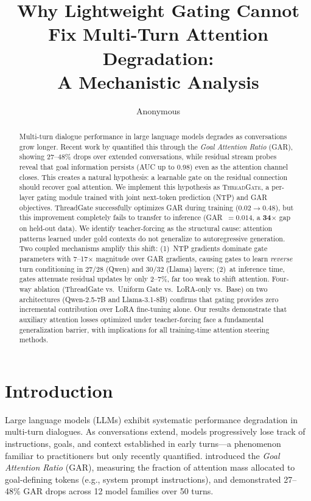 \documentclass[11pt,a4paper]{article}
\title{Why Lightweight Gating Cannot Fix Multi-Turn Attention Degradation:\\A Mechanistic Analysis}
\author{Anonymous}
\date{}
\begin{document}
\maketitle

\begin{abstract}
Multi-turn dialogue performance in large language models degrades as conversations grow longer.
Recent work by \citet{dongre2026} quantified this through the \emph{Goal Attention Ratio} (GAR), showing 27--48\% drops over extended conversations, while residual stream probes reveal that goal information persists (AUC up to 0.98) even as the attention channel closes.
This creates a natural hypothesis: a learnable gate on the residual connection should recover goal attention.
We implement this hypothesis as \textsc{ThreadGate}, a per-layer gating module trained with joint next-token prediction (NTP) and GAR objectives.
ThreadGate successfully optimizes GAR during training ($0.02 \to 0.48$), but this improvement completely fails to transfer to inference (GAR~$= 0.014$, a \textbf{34$\times$} gap on held-out data).
We identify teacher-forcing as the structural cause: attention patterns learned under gold contexts do not generalize to autoregressive generation.
Two coupled mechanisms amplify this shift: (1)~NTP gradients dominate gate parameters with 7--17$\times$ magnitude over GAR gradients, causing gates to learn \emph{reverse} turn conditioning in 27/28 (Qwen) and 30/32 (Llama) layers; (2)~at inference time, gates attenuate residual updates by only 2--7\%, far too weak to shift attention.
Four-way ablation (ThreadGate vs.\ Uniform Gate vs.\ LoRA-only vs.\ Base) on two architectures (Qwen-2.5-7B and Llama-3.1-8B) confirms that gating provides zero incremental contribution over LoRA fine-tuning alone.
Our results demonstrate that auxiliary attention losses optimized under teacher-forcing face a fundamental generalization barrier, with implications for all training-time attention steering methods.
\end{abstract}

\section{Introduction}

Large language models (LLMs) exhibit systematic performance degradation in multi-turn dialogues.
As conversations extend, models progressively lose track of instructions, goals, and context established in early turns---a phenomenon familiar to practitioners but only recently quantified.
\citet{dongre2026} introduced the \emph{Goal Attention Ratio} (GAR), measuring the fraction of attention mass allocated to goal-defining tokens (e.g., system prompt instructions), and demonstrated 27--48\% GAR drops across 12 model families over 50 turns.
\end{document}
